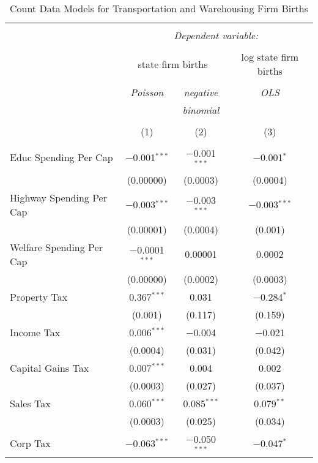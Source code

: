 
\begin{table}[!htbp] \centering 
  \caption{Count Data Models for Transportation and Warehousing Firm Births} 
  \label{} 
\begin{tabular}{@{\extracolsep{5pt}}lccc} 
\\[-1.8ex]\hline 
\hline \\[-1.8ex] 
 & \multicolumn{3}{c}{\textit{Dependent variable:}} \\ 
\cline{2-4} 
\\[-1.8ex] & \multicolumn{2}{c}{state firm births} & log state firm births \\ 
\\[-1.8ex] & \textit{Poisson} & \textit{negative} & \textit{OLS} \\ 
 & \textit{} & \textit{binomial} & \textit{} \\ 
\\[-1.8ex] & (1) & (2) & (3)\\ 
\hline \\[-1.8ex] 
 Educ Spending Per Cap & $-$0.001$^{***}$ & $-$0.001$^{***}$ & $-$0.001$^{*}$ \\ 
  & (0.00000) & (0.0003) & (0.0004) \\ 
  Highway Spending Per Cap  & $-$0.003$^{***}$ & $-$0.003$^{***}$ & $-$0.003$^{***}$ \\ 
  & (0.00001) & (0.0004) & (0.001) \\ 
  Welfare Spending Per Cap  & $-$0.0001$^{***}$ & 0.00001 & 0.0002 \\ 
  & (0.00000) & (0.0002) & (0.0003) \\ 
  Property Tax & 0.367$^{***}$ & 0.031 & $-$0.284$^{*}$ \\ 
  & (0.001) & (0.117) & (0.159) \\ 
  Income Tax & 0.006$^{***}$ & $-$0.004 & $-$0.021 \\ 
  & (0.0004) & (0.031) & (0.042) \\ 
  Capital Gains Tax & 0.007$^{***}$ & 0.004 & 0.002 \\ 
  & (0.0003) & (0.027) & (0.037) \\ 
  Sales Tax & 0.060$^{***}$ & 0.085$^{***}$ & 0.079$^{**}$ \\ 
  & (0.0003) & (0.025) & (0.034) \\ 
  Corp Tax & $-$0.063$^{***}$ & $-$0.050$^{***}$ & $-$0.047$^{*}$ \\ 

\end{tabular}
\end{table}
